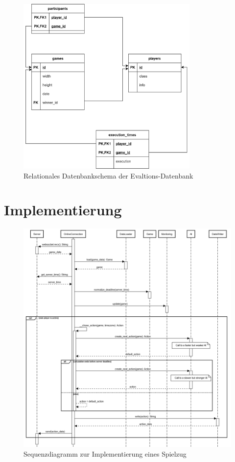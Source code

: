 \begin{figure}[htb]
\centering
\includegraphics[width=0.8\textwidth]{Bilder/relationales_db_schema.png}
\caption{Relationales Datenbankschema der Evaltions-Datenbank}
\label{fig:relationales-db-schema}
\end{figure}

\section{Implementierung}
\label{sec:anhang-implementierung}

\begin{figure}[htb]
	\centering
	\includegraphics[width=\textwidth]{Bilder/Sequenzdiagramm_Implementierung_Spielzug.png}
	\caption{Sequenzdiagramm zur Implementierung eines Spielzug}
	\label{fig:sequenzdiagramm-spielzug}
\end{figure}

